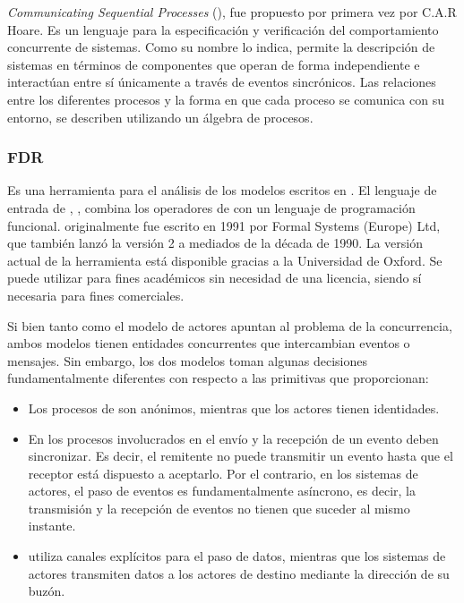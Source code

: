 \textit{Communicating Sequential Processes} (\CSP), fue propuesto por primera vez por C.A.R Hoare\cite{Hoare:1978:CSP:359576.359585}. Es un lenguaje para la especificación y verificación del comportamiento concurrente de sistemas. Como su nombre lo indica, \CSP permite la descripción de sistemas en términos de componentes que operan de forma independiente e interactúan entre sí únicamente a través de eventos sincrónicos. Las relaciones entre los diferentes procesos y la forma en que cada proceso se comunica con su entorno, se describen utilizando un álgebra de procesos.

\subsubsection*{FDR}

Es una herramienta para el análisis de los modelos escritos en \CSP. El lenguaje de entrada de \FDR, \CSPm, combina los operadores de \CSP con un lenguaje de programación funcional. \FDR originalmente fue escrito en 1991 por Formal Systems (Europe) Ltd, que también lanzó la versión 2 a mediados de la década de 1990. La versión actual de la herramienta está disponible gracias a la Universidad de Oxford. Se puede utilizar para fines académicos sin necesidad de una licencia, siendo sí necesaria para fines comerciales.

Si bien tanto \CSP como el modelo de actores apuntan al problema de la concurrencia, ambos modelos tienen entidades concurrentes que intercambian eventos o mensajes. Sin embargo, los dos modelos toman algunas decisiones fundamentalmente diferentes con respecto a las primitivas que proporcionan:

\begin{itemize}
\item Los procesos de \CSP son anónimos, mientras que los actores tienen identidades.
\item En \CSP los procesos involucrados en el envío y la recepción de un evento deben sincronizar. Es decir, el remitente no puede transmitir un evento hasta que el receptor está dispuesto a aceptarlo. Por el contrario, en los sistemas de actores, el paso de eventos es fundamentalmente asíncrono, es decir, la transmisión y la recepción de eventos no tienen que suceder al mismo instante.
\item \CSP utiliza canales explícitos para el paso de datos, mientras que los sistemas de actores transmiten datos a los actores de destino mediante la dirección de su buzón.
\end{itemize}

